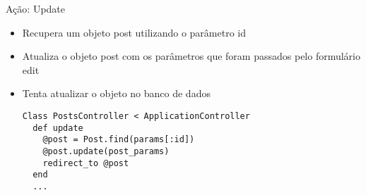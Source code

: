 \begin{frame}{Ação: Update}
	\begin{itemize}
		\item Recupera um objeto \alert{post} utilizando o parâmetro \alert{id}	
		\item Atualiza o objeto \alert{post} com os parâmetros que foram passados pelo
			formulário \alert{edit}
		\item Tenta \alert{atualizar} o objeto no \alert{banco de dados}
		\begin{lstlisting}[style=RubyInputStyle, caption=posts\_controller.rb]
Class PostsController < ApplicationController
  def update
    @post = Post.find(params[:id])
	@post.update(post_params)
	redirect_to @post
  end
  ...
  	\end{lstlisting}				
	\end{itemize}	
\end{frame}



